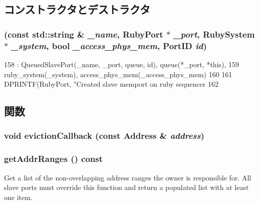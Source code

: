 \subsection{コンストラクタとデストラクタ}
\hypertarget{classRubyPort_1_1MemSlavePort_a898fd995c2b8563d692931dc72e50010}{
\subsubsection[{MemSlavePort}]{ (const std::string \& {\em \_\-name}, \/  {\bf RubyPort} $\ast$ {\em \_\-port}, \/  {\bf RubySystem} $\ast$ {\em \_\-system}, \/  bool {\em \_\-access\_\-phys\_\-mem}, \/  {\bf PortID} {\em id})}}
\label{classRubyPort_1_1MemSlavePort_a898fd995c2b8563d692931dc72e50010}



\begin{DoxyCode}
158     : QueuedSlavePort(_name, _port, queue, id), queue(*_port, *this),
159       ruby_system(_system), access_phys_mem(_access_phys_mem)
160 {
161     DPRINTF(RubyPort, "Created slave memport on ruby sequencer %
162 }
\end{DoxyCode}


\subsection{関数}
\hypertarget{classRubyPort_1_1MemSlavePort_a3af79aeefd596a230ebc3a579fcc3fb1}{
\subsubsection[{evictionCallback}]{\setlength{\rightskip}{0pt plus 5cm}void evictionCallback (const {\bf Address} \& {\em address})}}
\label{classRubyPort_1_1MemSlavePort_a3af79aeefd596a230ebc3a579fcc3fb1}
\hypertarget{classRubyPort_1_1MemSlavePort_a36cf113d5e5e091ebddb32306c098fae}{
\subsubsection[{getAddrRanges}]{ getAddrRanges () const}}
\label{classRubyPort_1_1MemSlavePort_a36cf113d5e5e091ebddb32306c098fae}
Get a list of the non-\/overlapping address ranges the owner is responsible for. All slave ports must override this function and return a populated list with at least one item.


